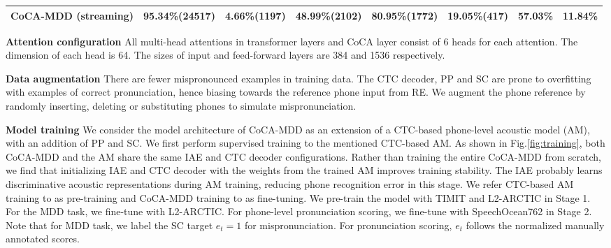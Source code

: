 \documentclass[a4paper]{article}
\begin{document}
\begin{table}[!t]
\begin{adjustbox}{width=1\textwidth}
\begin{tabular}{c|c|c|c|c|c|c|c}
CoCA-MDD (streaming)                     & 95.34\%(24517)      & 4.66\%(1197)            & 48.99\%(2102)                 & 80.95\%(1772) & 19.05\%(417) & 57.03\%                 & 11.84\%         \\ \hline
\end{tabular}
\end{adjustbox}
\label{result:mdd}
\end{table}

\noindent \textbf{Attention configuration} %
All multi-head attentions in transformer layers and CoCA layer consist of 6 heads for each attention. The dimension of each head is 64. The sizes of input and feed-forward layers are 384 and 1536 respectively. 

\noindent \textbf{Data augmentation} %
There are fewer mispronounced examples in training data. The CTC decoder, PP and SC are prone to overfitting with examples of correct pronunciation, hence biasing towards the reference phone input from RE. We augment the phone reference by randomly inserting, deleting or substituting phones to simulate mispronunciation.

\noindent \textbf{Model training} 
We consider the model architecture of CoCA-MDD as an extension of a CTC-based phone-level acoustic model (AM), with an addition of PP and SC. We first perform supervised training to the mentioned CTC-based AM. As shown in Fig.\ref{fig:training}, both CoCA-MDD and the AM share the same IAE and CTC decoder configurations. Rather than training the entire CoCA-MDD from scratch, we find that initializing IAE and CTC decoder with the weights from the trained AM improves 
training stability. The IAE probably learns discriminative acoustic representations during AM training, reducing phone recognition error in this stage. We refer CTC-based AM training to as pre-training and CoCA-MDD training to as fine-tuning. %
We pre-train the model with TIMIT and L2-ARCTIC
in Stage 1. For the MDD task, we fine-tune with L2-ARCTIC. For phone-level pronunciation scoring, we fine-tune with SpeechOcean762 in Stage 2. Note that for MDD task, we label the SC target $e_t=1$ for mispronunciation. For pronunciation scoring, $e_t$ follows the normalized manually annotated scores.
\end{document}
